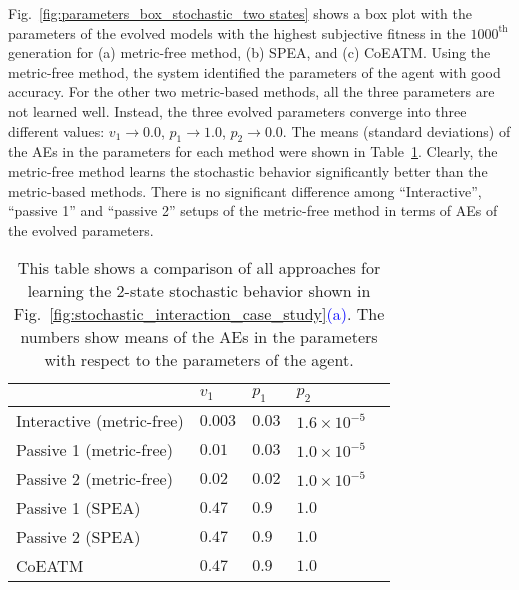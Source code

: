 Fig.~\ref{fig:parameters_box_stochastic_two states} shows a box plot with the parameters of the evolved models with the highest subjective fitness in the $1000^\mathrm{th}$ generation for (a) metric-free method, (b) SPEA, and (c) CoEATM. Using the metric-free method, the system identified the parameters of the agent with good accuracy. For the other two metric-based methods, all the three parameters are not learned well. Instead, the three evolved parameters converge into three different values: $v_1 \rightarrow 0.0$, $p_1 \rightarrow 1.0$, $p_2 \rightarrow 0.0$. The means (standard deviations) of the AEs in the parameters for each method were shown in Table~\ref{table:relative_accuracy_stochastic_2states}. Clearly, the metric-free method learns the stochastic behavior significantly better than the metric-based methods. There is no significant difference among ``Interactive'', ``passive 1'' and ``passive 2'' setups of the metric-free method in terms of AEs of the evolved parameters. 

\begin{table}[!t] 
\caption{This table shows a comparison of all approaches for learning the 2-state stochastic behavior shown in Fig.~\ref{fig:stochastic_interaction_case_study}\textcolor{blue}{(a)}. The numbers show means of the AEs in the parameters with respect to the parameters of the agent.} 
\renewcommand{\arraystretch}{1.1}
\centering %
\begin{tabular}{l l l l l} %
\hline\hline  %
 & $v_1$ & $p_1$ & $p_2$ &  \\  
\hline   %
Interactive (metric-free) & $0.003$ & $0.03$ & $1.6\times10^{-5}$ \\ %
Passive 1 (metric-free) & $0.01$ & $0.03$ & $1.0\times10^{-5}$ \\ 
Passive 2 (metric-free) & $0.02$ & $0.02$ & $1.0\times10^{-5}$ \\ 
Passive 1 (SPEA) & $0.47$ & $0.9$ & $1.0$ \\ 
Passive 2 (SPEA) & $0.47$ & $0.9$ & $1.0$ \\ 
CoEATM & $0.47$ & $0.9$ & $1.0$ \\
\hline %
\end{tabular} 
\label{table:relative_accuracy_stochastic_2states} 
\end{table} 

